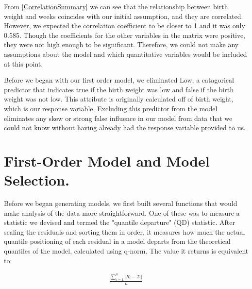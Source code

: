 \documentclass{article}\usepackage[]{graphicx}\usepackage[]{xcolor}
\begin{document}
\begin{enumerate}[a.]
From \ref{CorrelationSummary} we can see that the relationship between birth weight and weeks coincides with our initial assumption, and they are correlated. However, we expected the correlation coefficient to be closer to 1 and it was only 0.585. Though the coefficients for the other variables in the matrix were positive, they were not high enough to be significant. Therefore, we could not make any assumptions about the model and which quantitative variables would be included at this point.

\end{enumerate}

Before we began with our first order model, we eliminated Low, a catagorical predictor that indicates true if the birth weight was low and false if the birth weight was not low. This attribute is originally calculated off of birth weight, which is our response variable. Excluding this predictor from the model eliminates any skew or strong false influence in our model from data that we could not know without having already had the response variable provided to us.

\section{First-Order Model and Model Selection.}

Before we began generating models, we first built several functions that would make analysis of the data more straightforward. One of these was to measure a statistic we devised and termed the "quantile departure" (QD) statistic. After scaling the residuals and sorting them in order, it measures how much the actual quantile positioning of each residual in a model departs from the theoretical quantiles of the model, calculated using q-norm. The value it returns is equivalent to: 

\begin{align*}
\frac{\sum_{i=1}^{n}|R_i - T_i|}{n}
\end{align*}
\end{document}

